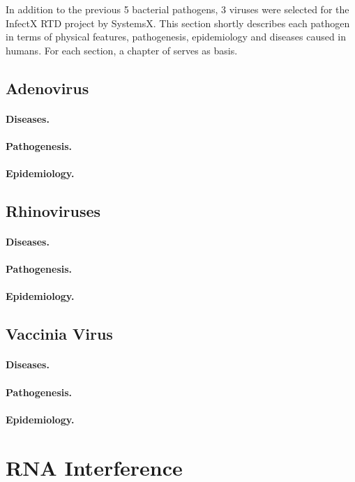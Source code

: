 In addition to the previous 5 bacterial pathogens, 3 viruses were selected for the InfectX RTD project by SystemsX. This section shortly describes each pathogen in terms of physical features, pathogenesis, epidemiology and diseases caused in humans. For each section, a chapter of \cite{Craighead2000} serves as basis.

\subsection{Adenovirus}
\paragraph{Diseases.}
\paragraph{Pathogenesis.}
\paragraph{Epidemiology.}

\subsection{Rhinoviruses}
\paragraph{Diseases.}
\paragraph{Pathogenesis.}
\paragraph{Epidemiology.}

\subsection{Vaccinia Virus}
\paragraph{Diseases.}
\paragraph{Pathogenesis.}
\paragraph{Epidemiology.}

\section{RNA Interference}
